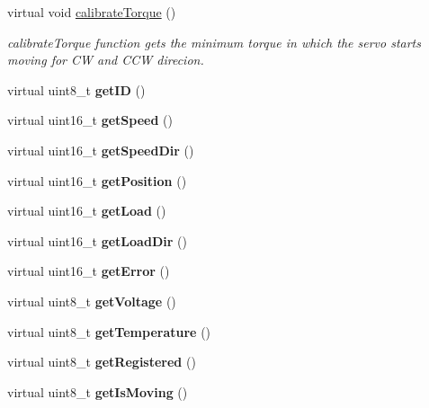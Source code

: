 \begin{DoxyCompactItemize}
\item 
virtual void \hyperlink{classServoRHA_a2b85e528b987d734d4b99613b49c594c}{calibrate\+Torque} ()
\begin{DoxyCompactList}\small\item\em calibrate\+Torque function gets the minimum torque in which the servo starts moving for CW and C\+CW direcion. \end{DoxyCompactList}\item 
virtual uint8\+\_\+t {\bfseries get\+ID} ()\hypertarget{classServoRHA_a5454c2a13b6656a590b7802e88cd1fbb}{}\label{classServoRHA_a5454c2a13b6656a590b7802e88cd1fbb}

\item 
virtual uint16\+\_\+t {\bfseries get\+Speed} ()\hypertarget{classServoRHA_a01e8bbdc94e8cc0310a86b7e7defaff7}{}\label{classServoRHA_a01e8bbdc94e8cc0310a86b7e7defaff7}

\item 
virtual uint16\+\_\+t {\bfseries get\+Speed\+Dir} ()\hypertarget{classServoRHA_aebcd18b6b147109d53362d2f61f1687b}{}\label{classServoRHA_aebcd18b6b147109d53362d2f61f1687b}

\item 
virtual uint16\+\_\+t {\bfseries get\+Position} ()\hypertarget{classServoRHA_aae38bc6f06e2b535d1aa97d430f7a754}{}\label{classServoRHA_aae38bc6f06e2b535d1aa97d430f7a754}

\item 
virtual uint16\+\_\+t {\bfseries get\+Load} ()\hypertarget{classServoRHA_add58df5938ca16e07ec9828964221f1b}{}\label{classServoRHA_add58df5938ca16e07ec9828964221f1b}

\item 
virtual uint16\+\_\+t {\bfseries get\+Load\+Dir} ()\hypertarget{classServoRHA_ad130103b70d1cbf88ac1d5875d5d4fa6}{}\label{classServoRHA_ad130103b70d1cbf88ac1d5875d5d4fa6}

\item 
virtual uint16\+\_\+t {\bfseries get\+Error} ()\hypertarget{classServoRHA_ad7bed5549d8ca28b38d931039501b6f1}{}\label{classServoRHA_ad7bed5549d8ca28b38d931039501b6f1}

\item 
virtual uint8\+\_\+t {\bfseries get\+Voltage} ()\hypertarget{classServoRHA_abeb8c284656cba00cc610c70c29a4f4f}{}\label{classServoRHA_abeb8c284656cba00cc610c70c29a4f4f}

\item 
virtual uint8\+\_\+t {\bfseries get\+Temperature} ()\hypertarget{classServoRHA_a736bfa0ce2d4351684224e80b832fd22}{}\label{classServoRHA_a736bfa0ce2d4351684224e80b832fd22}

\item 
virtual uint8\+\_\+t {\bfseries get\+Registered} ()\hypertarget{classServoRHA_a8ad6d15010e128afd0ab23b0d60d8c8c}{}\label{classServoRHA_a8ad6d15010e128afd0ab23b0d60d8c8c}

\item 
virtual uint8\+\_\+t {\bfseries get\+Is\+Moving} ()\hypertarget{classServoRHA_a9df86bb40710d2fef9a91d5098fd3900}{}\label{classServoRHA_a9df86bb40710d2fef9a91d5098fd3900}

\end{DoxyCompactItemize}
